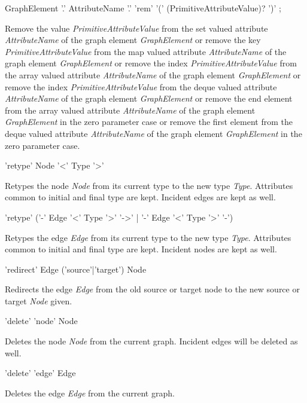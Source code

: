 \begin{rail}
  GraphElement '.' AttributeName '.' 'rem' '(' (PrimitiveAttributeValue)? ')' ;
\end{rail}
Remove the value \emph{PrimitiveAttributeValue} from the set valued attribute \emph{AttributeName} of the graph element \emph{GraphElement} or remove the key \emph{PrimitiveAttributeValue} from the map valued attribute \emph{AttributeName} of the graph element \emph{GraphElement} or remove the index \emph{PrimitiveAttributeValue} from the array valued attribute \emph{AttributeName} of the graph element \emph{GraphElement} or remove the index \emph{PrimitiveAttributeValue} from the deque valued attribute \emph{AttributeName} of the graph element \emph{GraphElement} or remove the end element from the array valued attribute \emph{AttributeName} of the graph element \emph{GraphElement} in the zero parameter case or remove the first element from the deque valued attribute \emph{AttributeName} of the graph element \emph{GraphElement} in the zero parameter case.


\begin{rail}
  'retype' Node '<' Type '>'
\end{rail}
Retypes the node \emph{Node} from its current type to the new type \emph{Type}. Attributes common to initial and final type are kept. Incident edges are kept as well. 

\begin{rail}
  'retype' ('-' Edge '<' Type '>' '->' | '-' Edge '<' Type '>' '-')
\end{rail}
Retypes the edge \emph{Edge} from its current type to the new type \emph{Type}. Attributes common to initial and final type are kept. Incident nodes are kept as well.

\begin{rail}
  'redirect' Edge ('source'|'target') Node
\end{rail}
Redirects the edge \emph{Edge} from the old source or target node to the new source or target \emph{Node} given.

\begin{rail}
  'delete' 'node' Node
\end{rail}
Deletes the node \emph{Node} from the current graph.
Incident edges will be deleted as well.

\begin{rail}
  'delete' 'edge' Edge
\end{rail}
Deletes the edge \emph{Edge} from the current graph.

